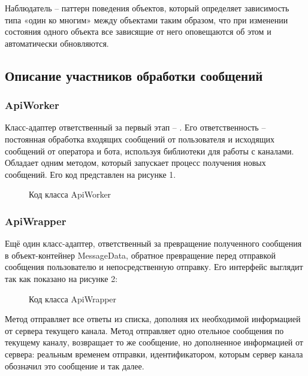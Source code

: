    Наблюдатель -- паттерн поведения объектов, который
    определяет зависимость типа «один ко многим» между объектами таким образом,
    что при изменении состояния одного объекта все зависящие от него оповещаются
    об этом и автоматически обновляются.\cite{design.patterns}
    
    \subsection{Описание участников обработки сообщений}
    \subsubsection{ApiWorker}
    Класс-адаптер ответственный за первый этап -- .
    Его ответственность -- постоянная обработка входящих сообщений от 
    пользователя и исходящих сообщений от оператора и бота, используя библиотеки
    для работы с каналами. Обладает одним методом, который запускает процесс 
    получения новых сообщений. Его код представлен на рисунке 1.
    \begin{figure}[H]
        \centering
        
        \caption{Код класса ApiWorker}
        \label{fig:api_worker}
    \end{figure}


    \subsubsection{ApiWrapper}
    Ещё один класс-адаптер, ответственный за превращение полученного сообщения 
    в объект-контейнер MessageData, обратное превращение перед отправкой
    сообщения пользователю и непосредственную отправку.
    Его интерфейс выглядит так как показано на рисунке 2:
    \begin{figure}[H]
        \centering
        
        \caption{Код класса ApiWrapper}
        \label{fig:api_wrapper}
    \end{figure}
    
    Метод  отправляет все ответы из списка, дополняя их
    необходимой информацией от сервера текущего канала. 
    Метод  отправляет одно отельное сообщения по текущему каналу,
    возвращает то же сообщение, но дополненное информацией от сервера: реальным временем
    отправки, идентификатором, которым сервер канала обозначил это сообщение и так далее.


